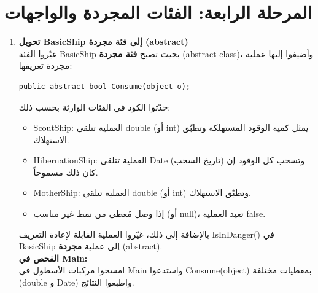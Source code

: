 \documentclass[14pt]{extarticle}
\begin{document}
\clearpage

\section*{المرحلة الرابعة: الفئات المجردة والواجهات}

\begin{enumerate}[resume, label=\textbf{تمرين \arabic*:}, wide=0pt, leftmargin=*, itemsep=2.2em]

    \item \textbf{تحويل \textenglish{BasicShip} إلى فئة مجردة (\textenglish{abstract})} \\
    غيّروا الفئة \textenglish{BasicShip} بحيث تصبح \textbf{فئة مجردة} (\textenglish{abstract class})، وأضيفوا إليها عملية مجردة تعريفها:
    \begin{boxCode}
    \begin{english}
    \begin{verbatim}
public abstract bool Consume(object o);
    \end{verbatim}
    \end{english}
    \end{boxCode}
    حدّثوا الكود في الفئات الوارثة بحسب ذلك:
    \begin{itemize}
        \item \textenglish{ScoutShip}: العملية تتلقى \textenglish{double} (أو \textenglish{int}) يمثل كمية الوقود المستهلكة وتطبّق الاستهلاك.
        \item \textenglish{HibernationShip}: العملية تتلقى \textenglish{Date} (تاريخ السحب) وتسحب كل الوقود إن كان ذلك مسموحاً.
        \item \textenglish{MotherShip}: العملية تتلقى \textenglish{double} (أو \textenglish{int}) وتطبّق الاستهلاك.
        \item إذا وصل مُعطى من نمط غير مناسب (أو \textenglish{null})، تعيد العملية \textenglish{false}.
    \end{itemize}
    بالإضافة إلى ذلك، غيّروا العملية القابلة لإعادة التعريف \textenglish{IsInDanger()} في \textenglish{BasicShip} إلى عملية \textbf{مجردة} (\textenglish{abstract}). \\
    \textbf{الفحص في \textenglish{Main}:} \\
    امسحوا مركبات الأسطول في \textenglish{Main} واستدعوا \textenglish{Consume(object)} بمعطيات مختلفة (\textenglish{double} و \textenglish{Date}) واطبعوا النتائج.


\end{enumerate}
\end{document}
